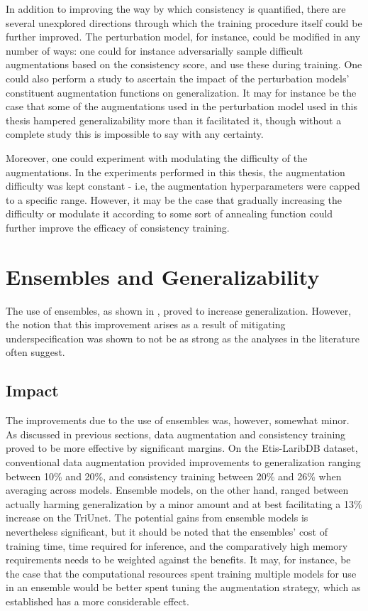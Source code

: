     In addition to improving the way by which consistency is quantified, there are several unexplored directions through which the training procedure itself could be further improved. The perturbation model, for instance, could be modified in any number of ways: one could for instance adversarially sample difficult augmentations based on the consistency score, and use these during training. One could also perform a study to ascertain the impact of the perturbation models' constituent augmentation functions on generalization. It may for instance be the case that some of the augmentations used in the perturbation model used in this thesis hampered generalizability more than it facilitated it, though without a complete study this is impossible to say with any certainty.  
    
    Moreover, one could experiment with modulating the difficulty of the augmentations. In the experiments performed in this thesis, the augmentation difficulty was kept constant - i.e, the augmentation hyperparameters were capped to a specific range. However, it may be the case that gradually increasing the difficulty or modulate it according to some sort of annealing function could further improve the efficacy of consistency training.    
\section{Ensembles and Generalizability}
    The use of ensembles, as shown in , proved to increase generalization. However, the notion that this improvement arises as a result of mitigating underspecification was shown to not be as strong as the analyses in the literature often suggest. 
    
    \subsection{Impact}
    The improvements due to the use of ensembles was, however, somewhat minor. As discussed in previous sections, data augmentation and consistency training proved to be more effective by significant margins. On the Etis-LaribDB dataset, conventional data augmentation provided improvements to generalization ranging between 10\% and 20\%, and consistency training between 20\% and 26\% when averaging across models. Ensemble models, on the other hand, ranged between actually harming generalization by a minor amount and at best facilitating a 13\% increase on the TriUnet.  The potential gains from ensemble models is nevertheless significant, but it should be noted that the ensembles' cost of training time, time required for inference, and the comparatively high memory requirements needs to be weighted against the benefits. It may, for instance, be the case that the computational resources spent training multiple models for use in an ensemble would be better spent tuning the augmentation strategy, which as established has a more considerable effect. 


